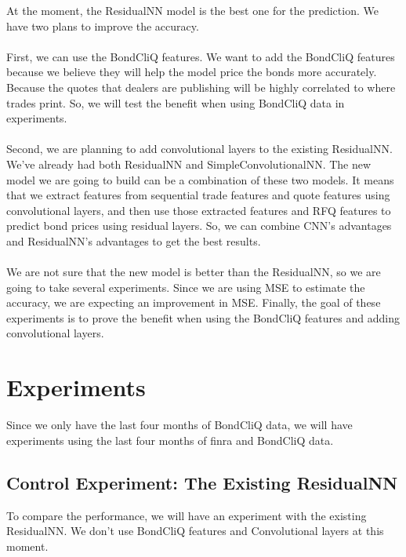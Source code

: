 \documentclass{article}
\begin{document}
At the moment, the ResidualNN model is the best one for the prediction. We have two plans to improve the accuracy.\\
\\
First, we can use the BondCliQ features. We want to add the BondCliQ features because we believe they will help the model price the bonds more accurately. Because the quotes that dealers are publishing will be highly correlated to where trades print. So, we will test the benefit when using BondCliQ data in experiments.\\
\\
Second, we are planning to add convolutional layers to the existing ResidualNN. We've already had both ResidualNN and SimpleConvolutionalNN. The new model we are going to build can be a combination of these two models. It means that we extract features from sequential trade features and quote features using convolutional layers, and then use those extracted features and RFQ features to predict bond prices using residual layers. So, we can combine CNN's advantages and ResidualNN's advantages to get the best results.\\
\\
We are not sure that the new model is better than the ResidualNN, so we are going to take several experiments. Since we are using MSE to estimate the accuracy, we are expecting an improvement in MSE. Finally, the goal of these experiments is to prove the benefit when using the BondCliQ features and adding convolutional layers.

\section{Experiments}

Since we only have the last four months of BondCliQ data, we will have experiments using the last four months of finra and BondCliQ data.

\subsection{Control Experiment: The Existing ResidualNN}

To compare the performance, we will have an experiment with the existing ResidualNN. We don't use BondCliQ features and Convolutional layers at this moment.
\end{document}
